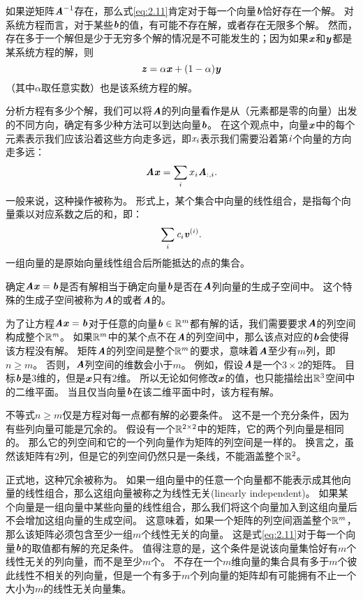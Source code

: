 如果逆矩阵$\MA^{-1}$存在，那么式\ref{eq:2.11}肯定对于每一个向量$\Vb$恰好存在一个解。
对系统方程而言，对于某些$\Vb$的值，有可能不存在解，或者存在无限多个解。
然而，存在多于一个解但是少于无穷多个解的情况是不可能发生的；因为如果$\Vx$和$\Vy$都是某系统方程的解，则
\begin{equation}
\Vz=\alpha \Vx + (1-\alpha) \Vy
\end{equation}
（其中$\alpha$取任意实数）也是该系统方程的解。


分析方程有多少个解，我们可以将$\MA$的列向量看作是从（元素都是零的向量）出发的不同方向，确定有多少种方法可以到达向量$\Vb$。
在这个观点中，向量$\Vx$中的每个元素表示我们应该沿着这些方向走多远，即$\Sx_{\Si}$表示我们需要沿着第$\Si$个向量的方向走多远：
\begin{equation}
\MA \Vx = \sum_i x_i \MA_{:,i}.
\end{equation}
一般来说，这种操作被称为。
形式上，某个集合中向量的线性组合，是指每个向量乘以对应系数之后的和，即：
\begin{equation}
    \sum_i \Sc_i \Vv^{(i)}.
\end{equation}
一组向量的是原始向量线性组合后所能抵达的点的集合。


确定$\MA\Vx=\Vb$是否有解相当于确定向量$\Vb$是否在$\MA$列向量的生成子空间中。
这个特殊的生成子空间被称为$\MA$的或者$\MA$的。


为了让方程$\MA \Vx=\Vb$对于任意的向量$\Vb \in \SetR^m$都有解的话，我们需要要求$\MA$的列空间构成整个$\SetR^{\Sm}$。
如果$\SetR^m$中的某个点不在$\MA$的列空间中，那么该点对应的$\Vb$会使得该方程没有解。
矩阵$\MA$的列空间是整个$\SetR^m$的要求，意味着$\MA$至少有$m$列，即$n\geq m$。
否则，$\MA$列空间的维数会小于$m$。
例如，假设$\MA$是一个$3\times 2$的矩阵。
目标$\Vb$是$3$维的，但是$\Vx$只有$2$维。
所以无论如何修改$\Vx$的值，也只能描绘出$\SetR^3$空间中的二维平面。
当且仅当向量$\Vb$在该二维平面中时，该方程有解。





不等式$n\geq m$仅是方程对每一点都有解的必要条件。
这不是一个充分条件，因为有些列向量可能是冗余的。
假设有一个$\SetR^{2\times 2}$中的矩阵，它的两个列向量是相同的。
那么它的列空间和它的一个列向量作为矩阵的列空间是一样的。
换言之，虽然该矩阵有$2$列，但是它的列空间仍然只是一条线，不能涵盖整个$\SetR^2$。


正式地，这种冗余被称为。
如果一组向量中的任意一个向量都不能表示成其他向量的线性组合，那么这组向量被称之为线性无关(linearly independent)。
如果某个向量是一组向量中某些向量的线性组合，那么我们将这个向量加入到这组向量后不会增加这组向量的生成空间。
这意味着，如果一个矩阵的列空间涵盖整个$\SetR^m$，那么该矩阵必须包含至少一组$m$个线性无关的向量。
这是式\ref{eq:2.11}对于每一个向量$\Vb$的取值都有解的充足条件。
值得注意的是，这个条件是说该向量集恰好有$m$个线性无关的列向量，而不是至少$m$个。
不存在一个$m$维向量的集合具有多于$m$个彼此线性不相关的列向量，但是一个有多于$m$个列向量的矩阵却有可能拥有不止一个大小为$m$的线性无关向量集。


